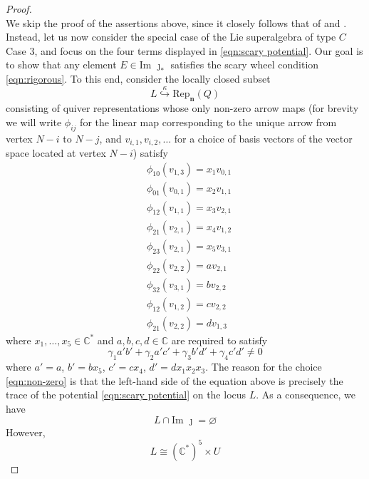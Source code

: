 \documentclass{amsart}
\def\BC{{\mathbb{C}}}
\def\bn{{\boldsymbol{n}}}
\begin{document}
\begin{proof}
\begin{equation}
\end{equation}
We skip the proof of the assertions above, since it closely follows that of \cite[Proposition 2.11]{N Wheel} and \cite[Corollary 1.18]{N Red}. Instead, let us now consider the special case of the Lie superalgebra of type $C$ Case $3$, and focus on the four terms displayed in \eqref{eqn:scary potential}. Our goal is to show that any element $E \in \text{Im }\jmath_*$ satisfies the scary wheel condition \eqref{eqn:rigorous}. To this end, consider the locally closed subset 
\[
L \stackrel{\kappa}\hookrightarrow \text{Rep}_{\bn}(Q)
\]
consisting of quiver representations whose only non-zero arrow maps (for brevity we will write $\phi_{ij}$ for the linear map corresponding to the unique arrow from vertex $N-i$ to $N-j$, and $v_{i,1},v_{i,2},\dots$ for a choice of basis vectors of the vector space located at vertex $N-i$) satisfy
\begin{equation}
\label{eqn:phi}
\begin{split} 
&\phi_{10}(v_{1,3}) = x_1 v_{0,1} \\
&\phi_{01}(v_{0,1}) = x_2 v_{1,1} \\ 
&\phi_{12}(v_{1,1}) = x_3 v_{2,1} \\
&\phi_{21}(v_{2,1}) = x_4 v_{1,2} \\
&\phi_{23}(v_{2,1}) = x_5 v_{3,1} \\
&\phi_{22}(v_{2,2}) = a v_{2,1} \\
&\phi_{32}(v_{3,1}) = b v_{2,2} \\
&\phi_{12}(v_{1,2}) = c v_{2,2} \\
&\phi_{21}(v_{2,2}) = d v_{1,3} 
\end{split} 
\end{equation}
where $x_1,\dots,x_5 \in \BC^*$ and $a,b,c,d \in \BC$ are required to satisfy
\begin{equation}
\label{eqn:non-zero}
\gamma_1 a'b' + \gamma_2 a'c' + \gamma_3 b'd' + \gamma_4 c'd' \neq 0
\end{equation}
where $a' = a$, $b' = b x_5$, $c' = cx_4$, $d' = dx_1x_2x_3$. The reason for the choice \eqref{eqn:non-zero} is that the left-hand side of the equation above is precisely the trace of the potential \eqref{eqn:scary potential} on the locus $L$. As a consequence, we have
\begin{equation}
\label{eqn:choice 2}
L \cap \text{Im }\jmath = \varnothing
\end{equation}
However,
\begin{equation}
\label{eqn:choice 1}
L \cong (\BC^*)^5 \times U 

\end{equation}
\end{proof}
\end{document}
